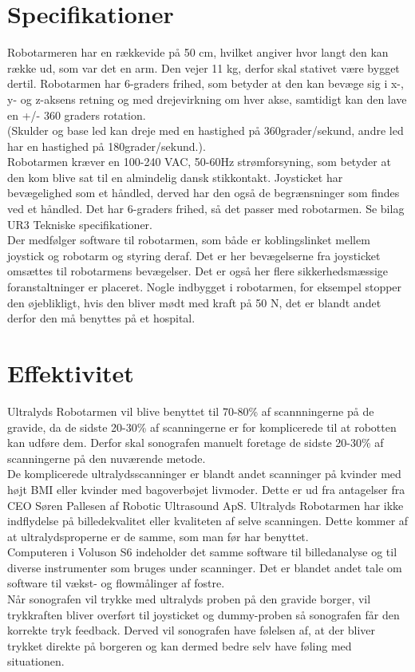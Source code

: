 \section{Specifikationer}
Robotarmeren har en rækkevide på 50 cm, hvilket angiver hvor langt den kan række ud, som var det en arm. Den vejer 11 kg, derfor skal stativet være bygget dertil. Robotarmen har 6-graders frihed, som betyder at den kan bevæge sig i x-, y- og z-aksens retning og med drejevirkning om hver akse, samtidigt kan den lave en +/- 360 graders rotation. \\
(Skulder og base led kan dreje med en hastighed på 360grader/sekund,  andre led har en hastighed på 180grader/sekund.). \\
Robotarmen kræver en 100-240 VAC, 50-60Hz strømforsyning, som betyder at den kom blive sat til en almindelig dansk stikkontakt. 
\newline 
Joysticket har bevægelighed som et håndled, derved har den også de begrænsninger som findes ved et håndled. Det har 6-graders frihed, så det passer med robotarmen. Se bilag UR3 Tekniske specifikationer. \\

Der medfølger software til robotarmen, som både er koblingslinket mellem joystick og robotarm og styring deraf. Det er her bevægelserne fra joysticket omsættes til robotarmens bevægelser. Det er også her flere sikkerhedsmæssige foranstaltninger er placeret. Nogle indbygget i robotarmen, for eksempel stopper den øjeblikligt, hvis den bliver mødt med kraft på 50 N, det er blandt andet derfor den må benyttes på et hospital.    

\section{Effektivitet}
Ultralyds Robotarmen vil blive benyttet til 70-80\% af scannningerne på de gravide, da de sidste 20-30\% af scanningerne er for komplicerede til at robotten kan udføre dem. Derfor skal sonografen manuelt foretage de sidste 20-30\% af scanningerne på den nuværende metode. \\ 
De komplicerede ultralydsscanninger er blandt andet scanninger på kvinder med højt BMI eller kvinder med bagoverbøjet livmoder. Dette er ud fra antagelser fra CEO Søren Pallesen af Robotic Ultrasound ApS. 
\newline 
Ultralyds Robotarmen har ikke indflydelse på billedekvalitet eller kvaliteten af selve scanningen. Dette kommer af at ultralydsproperne er de samme, som man før har benyttet. \\Computeren i Voluson S6 indeholder det samme software til billedanalyse og til diverse instrumenter som bruges under scanninger. Det er blandet andet tale om software til vækst- og flowmålinger af fostre.   \\
Når sonografen vil trykke med ultralyds proben på den gravide borger, vil trykkraften bliver overført til joysticket og dummy-proben så sonografen får den korrekte tryk feedback. Derved vil sonografen have følelsen af, at der bliver trykket direkte på borgeren og kan dermed bedre selv have føling med situationen. 
